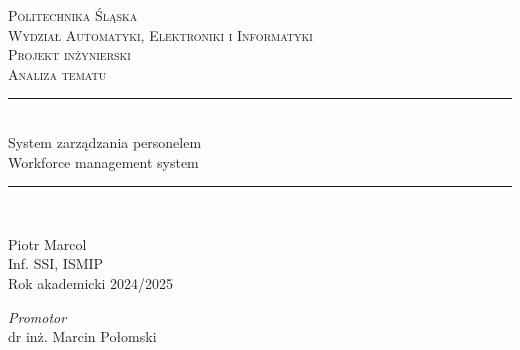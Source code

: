 \begin{titlepage} %

    \newcommand{\HRule}{\rule{\linewidth}{0.5mm}} %

    \center %


    \textsc{\LARGE Politechnika Śląska}\\[0.5cm] %

    \textsc{\Large Wydział Automatyki, Elektroniki i Informatyki}\\[1.5cm] %

    \textsc{\Large Projekt inżynierski}\\[0.5cm] %

    \textsc{\LARGE Analiza tematu}\\[0.2cm] %


    \HRule\\[0.4cm]

    { \LARGE System zarządzania personelem \\[0.2cm]
    Workforce management system }\\[0.2cm] %

    \HRule\\[1.5cm]


    \begin{minipage}{0.5\textwidth}
        \begin{flushleft}
            Piotr Marcol\\
            Inf. SSI, ISMIP\\
            Rok akademicki 2024/2025
        \end{flushleft}
    \end{minipage}
    \begin{minipage}{0.4\textwidth}
        \begin{flushright}
            \textit{Promotor}\\
            dr inż. Marcin Połomski
        \end{flushright}
    \end{minipage}




\end{titlepage}
